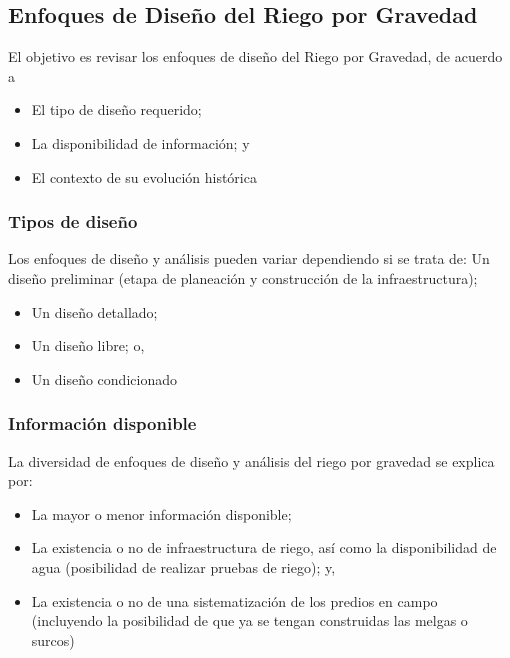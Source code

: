 \subsection{Enfoques de Diseño del Riego por Gravedad}
El objetivo es revisar los enfoques de diseño del Riego por Gravedad, de acuerdo a
\begin{itemize}
    \item El tipo de diseño requerido;
    \item La disponibilidad de información; y
    \item El contexto de su evolución histórica
\end{itemize}
\subsubsection{Tipos de diseño} 
Los enfoques de diseño y análisis pueden variar
dependiendo si se trata de:
Un diseño preliminar (etapa de
planeación y construcción de la
infraestructura);
\begin{itemize}
    \item Un diseño detallado;
    \item Un diseño libre; o,
    \item Un diseño condicionado
\end{itemize}
\subsubsection{Información disponible}
La diversidad de enfoques de diseño y análisis
del riego por gravedad se explica por:
\begin{itemize}
    \item La mayor o menor información disponible;
    \item La existencia o no de infraestructura de riego, así como la disponibilidad de agua (posibilidad de realizar pruebas de riego); y,
    \item La existencia o no de una sistematización de los predios en campo (incluyendo la posibilidad de que ya se tengan construidas las melgas o surcos)    
\end{itemize}
